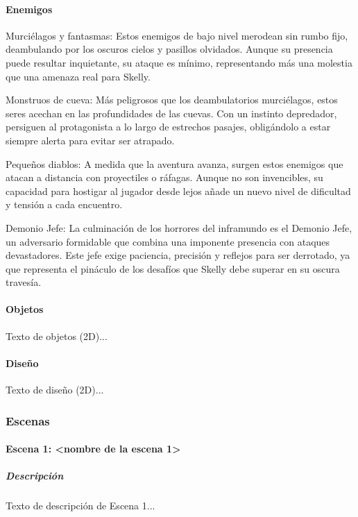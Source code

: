 \documentclass[12pt,a4paper,twoside,spanish]{article}      %
\begin{document}
\paragraph{Enemigos}
\begin{itmize}
    \item Murciélagos y fantasmas: Estos enemigos de bajo nivel merodean sin rumbo fijo, deambulando por los oscuros cielos y pasillos olvidados. Aunque su presencia puede resultar inquietante, su ataque es mínimo, representando más una molestia que una amenaza real para Skelly.

    \item Monstruos de cueva: Más peligrosos que los deambulatorios murciélagos, estos seres acechan en las profundidades de las cuevas. Con un instinto depredador, persiguen al protagonista a lo largo de estrechos pasajes, obligándolo a estar siempre alerta para evitar ser atrapado.

    \item Pequeños diablos: A medida que la aventura avanza, surgen estos enemigos que atacan a distancia con proyectiles o ráfagas. Aunque no son invencibles, su capacidad para hostigar al jugador desde lejos añade un nuevo nivel de dificultad y tensión a cada encuentro.

    \item Demonio Jefe: La culminación de los horrores del inframundo es el Demonio Jefe, un adversario formidable que combina una imponente presencia con ataques devastadores. Este jefe exige paciencia, precisión y reflejos para ser derrotado, ya que representa el pináculo de los desafíos que Skelly debe superar en su oscura travesía.
\end{itmize}

\paragraph{Objetos}
Texto de objetos (2D)...

\paragraph{Diseño}
Texto de diseño (2D)...

\subsubsection{Escenas}
\paragraph{Escena 1: <nombre de la escena 1>}
\subparagraph{Descripción}
Texto de descripción de Escena 1...
\end{document}
